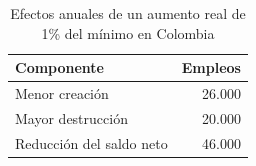 \begin{table}[H]
\centering\small
\caption{Efectos anuales de un aumento real de 1\% del mínimo en Colombia}
\label{tab:florez-empleo}
\begin{tabularx}{\textwidth}{@{}>{\raggedright\arraybackslash}Xr@{}}
\toprule
Componente & Empleos\\
\midrule
Menor creación & 26.000\\
Mayor destrucción & 20.000\\
Reducción del saldo neto & 46.000\\
\bottomrule
\end{tabularx}
\end{table}
